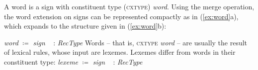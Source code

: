 \documentclass[output=paper,biblatex,babelshorthands,newtxmath,draftmode,colorlinks,citecolor=brown]{langscibook}
\begin{document}
\avm{
[dgb-params & : $R_1$\\
cont & = [q-params & : $R_0$] ]
}
\z



A word is a sign with constituent type (\textsc{cxtype}) \emph{word}.
%
Using the merge operation, the word extension on signs can be represented compactly as in (\ref{ex:word}a), which expands to the structure given in (\ref{ex:word}b):
%

\ea \label{ex:word}
\ea \emph{word} $\coloneqq$ \emph{sign} \ttrmerge\
 : \emph{RecType}
\ex 
{}
\z
\z
%
Words -- that is, \textsc{cxtype} \emph{word} -- are usually the result of lexical rules, whose input are lexemes.
%
Lexemes differ from words in their constituent type:
%
\ea
\emph{lexeme} $\coloneqq$ \emph{sign} \ttrmerge\
: \emph{RecType}
\z
\end{document}
